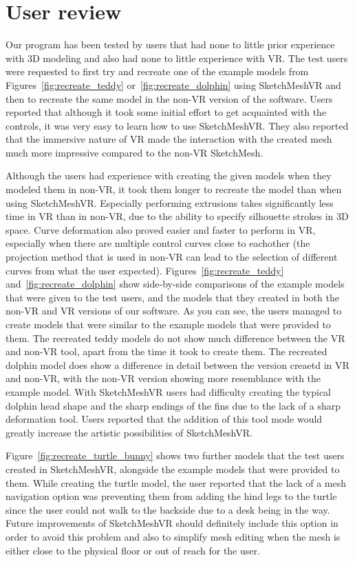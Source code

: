 \section{User review}
Our program has been tested by users that had none to little prior experience with 3D modeling and also had none to little experience with VR. The test users were requested to first try and recreate one of the example models from Figures~\ref{fig:recreate_teddy} or~\ref{fig:recreate_dolphin} using SketchMeshVR and then to recreate the same model in the non-VR version of the software. Users reported that although it took some initial effort to get acquainted with the controls, it was very easy to learn how to use SketchMeshVR. They also reported that the immersive nature of VR made the interaction with the created mesh much more impressive compared to the non-VR SketchMesh. 

Although the users had experience with creating the given models when they modeled them in non-VR, it took them longer to recreate the model than when using SketchMeshVR. Especially performing extrusions takes significantly less time in VR than in non-VR, due to the ability to specify silhouette strokes in 3D space. Curve deformation also proved easier and faster to perform in VR, especially when there are multiple control curves close to eachother (the projection method that is used in non-VR can lead to the selection of different curves from what the user expected). Figures~\ref{fig:recreate_teddy} and~\ref{fig:recreate_dolphin} show side-by-side comparisons of the example models that were given to the test users, and the models that they created in both the non-VR and VR versions of our software. As you can see, the users managed to create models that were similar to the example models that were provided to them. The recreated teddy models do not show much difference between the VR and non-VR tool, apart from the time it took to create them. The recreated dolphin model does show a difference in detail between the version creaetd in VR and non-VR, with the non-VR version showing more resemblance with the example model. With SketchMeshVR users had difficulty creating the typical dolphin head shape and the sharp endings of the fins due to the lack of a sharp deformation tool. Users reported that the addition of this tool mode would greatly increase the artistic possibilities of SketchMeshVR.

Figure~\ref{fig:recreate_turtle_bunny} shows two further models that the test users created in SketchMeshVR, alongside the example models that were provided to them. While creating the turtle model, the user reported that the lack of a mesh navigation option was preventing them from adding the hind legs to the turtle since the user could not walk to the backside due to a desk being in the way. Future improvements of SketchMeshVR should definitely include this option in order to avoid this problem and also to simplify mesh editing when the mesh is either close to the physical floor or out of reach for the user.

